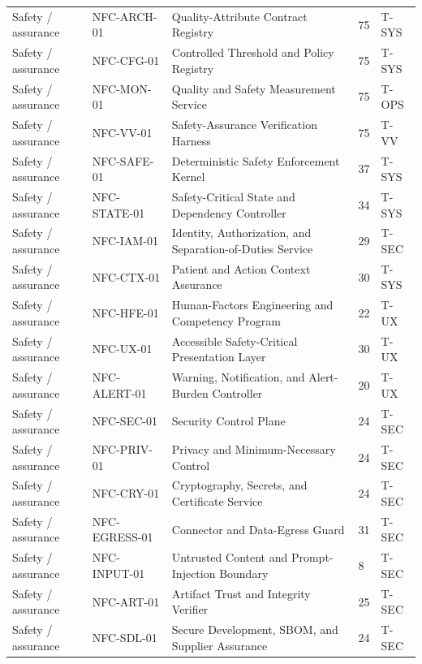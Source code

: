 \documentclass[11pt,letterpaper]{article}
\begin{document}
\begin{scriptsize}
\begin{longtable}{@{}L{0.12\textwidth}L{0.14\textwidth}L{0.44\textwidth}L{0.14\textwidth}L{0.08\textwidth}@{}}
\addlinespace[2pt]
Safety / assurance & NFC-ARCH-01 & Quality-Attribute Contract Registry & 75 & T-SYS \\
\addlinespace[2pt]
Safety / assurance & NFC-CFG-01 & Controlled Threshold and Policy Registry & 75 & T-SYS \\
\addlinespace[2pt]
Safety / assurance & NFC-MON-01 & Quality and Safety Measurement Service & 75 & T-OPS \\
\addlinespace[2pt]
Safety / assurance & NFC-VV-01 & Safety-Assurance Verification Harness & 75 & T-VV \\
\addlinespace[2pt]
Safety / assurance & NFC-SAFE-01 & Deterministic Safety Enforcement Kernel & 37 & T-SYS \\
\addlinespace[2pt]
Safety / assurance & NFC-STATE-01 & Safety-Critical State and Dependency Controller & 34 & T-SYS \\
\addlinespace[2pt]
Safety / assurance & NFC-IAM-01 & Identity, Authorization, and Separation-of-Duties Service & 29 & T-SEC \\
\addlinespace[2pt]
Safety / assurance & NFC-CTX-01 & Patient and Action Context Assurance & 30 & T-SYS \\
\addlinespace[2pt]
Safety / assurance & NFC-HFE-01 & Human-Factors Engineering and Competency Program & 22 & T-UX \\
\addlinespace[2pt]
Safety / assurance & NFC-UX-01 & Accessible Safety-Critical Presentation Layer & 30 & T-UX \\
\addlinespace[2pt]
Safety / assurance & NFC-ALERT-01 & Warning, Notification, and Alert-Burden Controller & 20 & T-UX \\
\addlinespace[2pt]
Safety / assurance & NFC-SEC-01 & Security Control Plane & 24 & T-SEC \\
\addlinespace[2pt]
Safety / assurance & NFC-PRIV-01 & Privacy and Minimum-Necessary Control & 24 & T-SEC \\
\addlinespace[2pt]
Safety / assurance & NFC-CRY-01 & Cryptography, Secrets, and Certificate Service & 24 & T-SEC \\
\addlinespace[2pt]
Safety / assurance & NFC-EGRESS-01 & Connector and Data-Egress Guard & 31 & T-SEC \\
\addlinespace[2pt]
Safety / assurance & NFC-INPUT-01 & Untrusted Content and Prompt-Injection Boundary & 8 & T-SEC \\
\addlinespace[2pt]
Safety / assurance & NFC-ART-01 & Artifact Trust and Integrity Verifier & 25 & T-SEC \\
\addlinespace[2pt]
Safety / assurance & NFC-SDL-01 & Secure Development, SBOM, and Supplier Assurance & 24 & T-SEC \\

\end{longtable}
\end{scriptsize}
\end{document}

